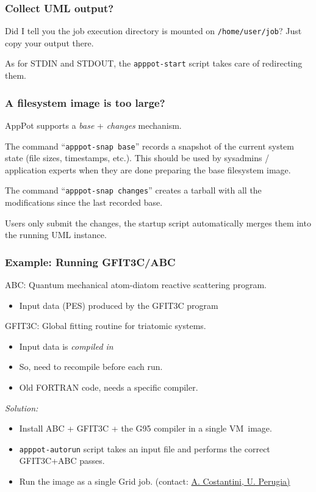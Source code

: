 \documentclass{beamer}
\begin{document}
\begin{frame}
  \frametitle{Collect UML output?}
  \label{sec:16}
  Did I tell you the job execution directory is mounted on
  \texttt{/home/user/job}? Just copy your output there.

  \+
  As for STDIN and STDOUT, the \texttt{apppot-start} script takes care of
  redirecting them.
\end{frame}


\begin{frame}
  \frametitle{A filesystem image is too large?}
  \label{sec:15}
  AppPot supports a \emph{base} + \emph{changes} mechanism.

  \+
  The command ``\texttt{apppot-snap base}'' records a snapshot of the current
  system state (file sizes, timestamps, etc.).  This should be used by
  sysadmins / application experts when they are done preparing the
  base filesystem image.

  \+
  The command ``\texttt{apppot-snap changes}'' creates a tarball with all the
  modifications since the last recorded base.

  \+
  Users only submit the changes, the startup script automatically
  merges them into the running UML instance.
\end{frame}


\begin{frame}
  \frametitle{Example: Running GFIT3C/ABC}

  ABC: Quantum mechanical atom-diatom reactive scattering program.
  \begin{itemize}
  \item Input data (PES) produced by the GFIT3C program
  \end{itemize}

  \+ GFIT3C: Global fitting routine for triatomic systems.
  \begin{itemize}
  \item Input data is \emph{compiled in}
  \item So, need to recompile before each run.
  \item Old FORTRAN code, needs a specific compiler.
  \end{itemize}

  \+
  \emph{Solution:}
  \begin{itemize}
  \item Install ABC + GFIT3C + the G95 compiler in a single
    VM~image.
  \item \texttt{apppot-autorun} script takes an input file and
    performs the correct GFIT3C+ABC passes.
  \item Run the image as a single Grid job.
    {\hfill\tiny (contact: \href{mailto:alex.costantini@gmail.com}{A. Costantini, U. Perugia)}}
  \end{itemize}
\end{frame}
\end{document}
